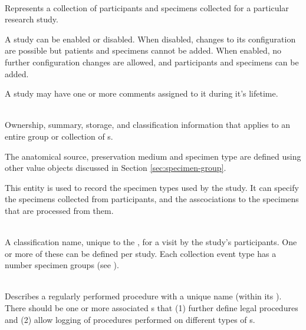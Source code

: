 \begin{description}[listparindent=\parindent]

  \item[\entitytarget{Study}] \hfill \\ Represents a collection of participants and
    specimens collected for a particular research study.

    A study can be enabled or disabled. When disabled, changes to its
    configuration are possible but patients and specimens cannot be added. When
    enabled, no further configuration changes are allowed, and participants and
    specimens can be added.

    A study may have one or more comments assigned to it during it's lifetime.

  \item[\entitytarget{SpecimenGroup}] \hfill \\ Ownership, summary, storage,
    and classification information that applies to an entire group or
    collection of s.

    The anatomical source, preservation medium and specimen type are defined
    using other value objects discussed in Section \ref{sec:specimen-group}.

    This entity is used to record the specimen types used by the study. It can
    specify the specimens collected from participants, and the asscociations to
    the specimens that are processed from them.

  \item[\entitytarget{CollectionEventType}] \hfill \\ A classification name,
    unique to the , for a visit by the study's
    participants. One or more of these can be defined per study. Each
    collection event type has a number specimen groups (see
    ).

  \item[\entitytarget{ProcessingType}] \hfill \\ Describes a regularly
    performed procedure with a unique name (within its
    ). There should be one or more associated
    s that (1) further define legal
    procedures and (2) allow logging of procedures performed on different types
    of s.

  \item[\entitytarget{}] \hfill \\

  \item[\entitytarget{}] \hfill \\


\end{description}

